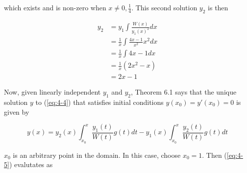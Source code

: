 \documentclass{article}
\begin{document}
which exists and is non-zero when $x \neq 0, \frac{1}{4}$. This second solution $y_2$ is then

\begin{align*}
    y_2 &= y_1\int \frac{W(x)}{y_1(x)^2} dx\\
    &= \frac{1}{x} \int \frac{4x - 1}{x^2} x^2 dx\\
    &= \frac{1}{x} \int 4x - 1 dx\\
    &= \frac{1}{x}(2x^2 - x)\\
    &= 2x - 1
\end{align*}

Now, given linearly independent $y_1$ and $y_2$, Theorem 6.1 says that the unique solution $y$ to (\ref{eq:4-4}) that satisfies initial conditions
$y(x_0) = y'(x_0) = 0$ is given by

\begin{equation} \label{eq:4-5}
    y(x) = y_2(x) \int_{x_0}^x \frac{y_1(t)}{W(t)}g(t) dt - y_1(x) \int_{x_0}^x \frac{y_2(t)}{W(t)} g(t) dt
\end{equation}

$x_0$ is an arbitrary point in the domain. In this case, choose $x_0 = 1$. Then (\ref{eq:4-5}) evalutates as
\end{document}
